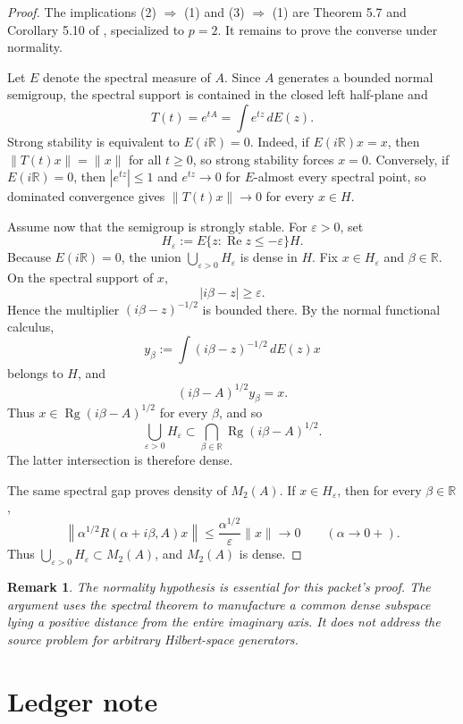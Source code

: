 \documentclass[11pt]{article}
\newtheorem{remark}{Remark}
\DeclareMathOperator{\Rg}{Rg}
\DeclareMathOperator{\Ree}{Re}
\begin{document}
\begin{proof}
The implications (2) \(\Rightarrow\) (1) and (3) \(\Rightarrow\) (1) are
Theorem 5.7 and Corollary 5.10 of \cite{BCT}, specialized to \(p=2\).
It remains to prove the converse under normality.

Let \(E\) denote the spectral measure of \(A\).  Since \(A\) generates a
bounded normal semigroup, the spectral support is contained in the closed left
half-plane and
\[
T(t)=e^{tA}=\int e^{tz}\,dE(z).
\]
Strong stability is equivalent to \(E(i\mathbb R)=0\).  Indeed, if
\(E(i\mathbb R)x=x\), then \(\|T(t)x\|=\|x\|\) for all \(t\ge0\), so strong
stability forces \(x=0\).  Conversely, if \(E(i\mathbb R)=0\), then
\(|e^{tz}|\le1\) and \(e^{tz}\to0\) for \(E\)-almost every spectral point, so
dominated convergence gives \(\|T(t)x\|\to0\) for every \(x\in H\).

Assume now that the semigroup is strongly stable.  For \(\varepsilon>0\), set
\[
H_\varepsilon:=E\{z:\Ree z\le -\varepsilon\}H .
\]
Because \(E(i\mathbb R)=0\), the union \(\bigcup_{\varepsilon>0}H_\varepsilon\)
is dense in \(H\).  Fix \(x\in H_\varepsilon\) and \(\beta\in\mathbb R\).  On
the spectral support of \(x\),
\[
|i\beta-z|\ge \varepsilon .
\]
Hence the multiplier \((i\beta-z)^{-1/2}\) is bounded there.  By the normal
functional calculus,
\[
y_\beta:=\int (i\beta-z)^{-1/2}\,dE(z)x
\]
belongs to \(H\), and
\[
(i\beta-A)^{1/2}y_\beta=x.
\]
Thus \(x\in\Rg(i\beta-A)^{1/2}\) for every \(\beta\), and so
\[
\bigcup_{\varepsilon>0}H_\varepsilon
\subset
\bigcap_{\beta\in\mathbb R}\Rg(i\beta-A)^{1/2}.
\]
The latter intersection is therefore dense.

The same spectral gap proves density of \(M_2(A)\).  If \(x\in H_\varepsilon\),
then for every \(\beta\in\mathbb R\),
\[
\left\|\alpha^{1/2}R(\alpha+i\beta,A)x\right\|
\le
\frac{\alpha^{1/2}}{\varepsilon}\|x\|\longrightarrow0
\qquad(\alpha\to0+).
\]
Thus \(\bigcup_{\varepsilon>0}H_\varepsilon\subset M_2(A)\), and \(M_2(A)\)
is dense.
\end{proof}

\begin{remark}
The normality hypothesis is essential for this packet's proof.  The argument
uses the spectral theorem to manufacture a common dense subspace lying a
positive distance from the entire imaginary axis.  It does not address the
source problem for arbitrary Hilbert-space generators.
\end{remark}

\section*{Ledger note}
\end{document}
